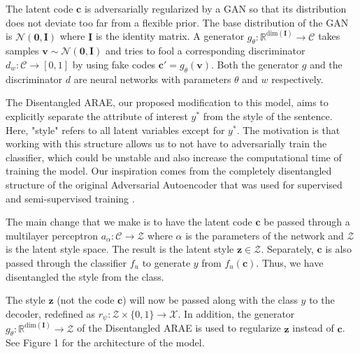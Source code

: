 \documentclass{article}
\newcommand{\vect}[1]{\boldsymbol{#1}}
\begin{document}
The latent code $\vect{c}$ is adversarially regularized by a GAN so that its distribution does not deviate too far from a flexible prior.  The base distribution of the GAN is $\mathcal{N}(\vect{0}, \vect{I})$ where $\vect{I}$ is the identity matrix.  A generator $g_\theta : \mathbb{R}^{\text{dim}(\vect{I})} \to \mathcal{C}$ takes samples $\vect{v} \sim \mathcal{N}(\vect{0}, \vect{I})$ and tries to fool a corresponding discriminator $d_w : \mathcal{C} \to [0, 1]$ by using fake codes $\vect{c}' = g_\theta(\vect{v})$.  Both the generator $g$ and the discriminator $d$ are neural networks with parameters $\theta$ and $w$ respectively.

The Disentangled ARAE, our proposed modification to this model, aims to explicitly separate the attribute of interest $y^*$ from the style of the sentence.  Here, "style" refers to all latent variables except for $y^*$.  The motivation is that working with this structure allows us to not have to adversarially train the classifier, which could be unstable and also increase the computational time of training the model.  Our inspiration comes from the completely disentangled structure of the original Adversarial Autoencoder that was used for supervised and semi-supervised training \cite{aae}.

The main change that we make is to have the latent code $\vect{c}$ be passed through a multilayer perceptron $a_\alpha : \mathcal{C} \to \mathcal{Z}$  where $\alpha$ is the parameters of the network and $\mathcal{Z}$ is the latent style space.  The result is the latent style $\vect{z} \in \mathcal{Z}$.  Separately, $\vect{c}$ is also passed through the classifier $f_u$ to generate $y$ from $f_u(\vect{c})$.  Thus, we have disentangled the style from the class.  

The style $\vect{z}$ (not the code $\vect{c}$) will now be passed along with the class $y$ to the decoder, redefined as $r_\psi : \mathcal{Z} \times \{0, 1\} \to \mathcal{X}$.  In addition, the generator $g_\theta : \mathbb{R}^{\text{dim}(\vect{I})} \to \mathcal{Z}$ of the Disentangled ARAE is used to regularize $\vect{z}$ instead of $\vect{c}$.  See Figure 1 for the architecture of the model.       
\end{document}
